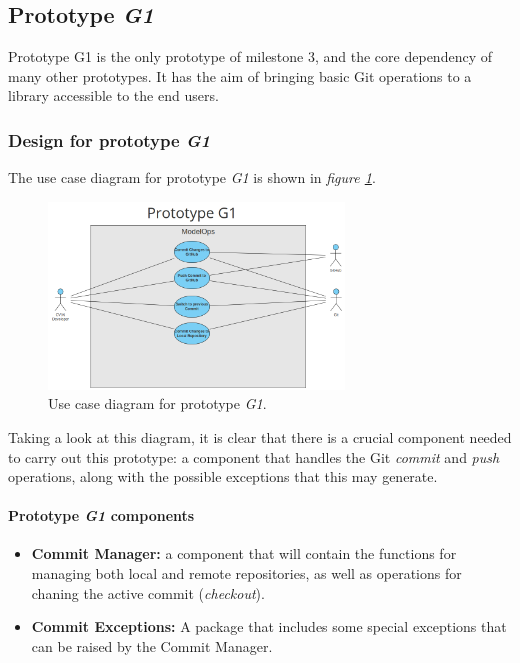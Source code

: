 \subsection{Prototype \emph{G1}}

Prototype G1 is the only prototype of milestone 3, and the core dependency of many other prototypes. It has the aim of bringing basic Git operations to a library accessible to the end users.

\subsubsection{Design for prototype \emph{G1}}

The use case diagram for prototype \emph{G1} is shown in \emph{figure \ref{fig:useCaseG1}}.

\begin{figure}[H]
    \centering
    \includegraphics[width=0.7\textwidth]{figs/use-case-G1.png}
    \caption{Use case diagram for prototype \emph{G1}.}
    \label{fig:useCaseG1}
\end{figure}

Taking a look at this diagram, it is clear that there is a crucial component needed to carry out this prototype: a component that handles the Git \emph{commit} and \emph{push} operations, along with
the possible exceptions that this may generate.

\paragraph{Prototype \emph{G1} components}

\begin{itemize}
    \item \textbf{Commit Manager: }a component that will contain the functions for managing both local and remote repositories, as well as operations for chaning the active commit (\emph{checkout}).
    
    \item \textbf{Commit Exceptions: }A package that includes some special exceptions that can be raised by the Commit Manager.
\end{itemize}

